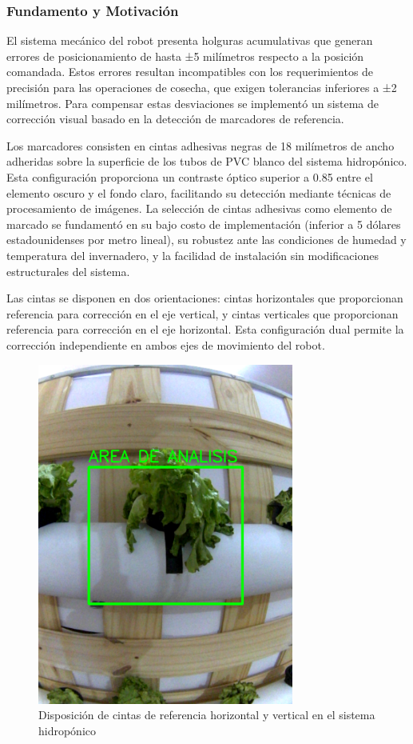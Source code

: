 \subsubsection{Fundamento y Motivación}

El sistema mecánico del robot presenta holguras acumulativas que generan errores de posicionamiento de hasta ±5 milímetros respecto a la posición comandada. Estos errores resultan incompatibles con los requerimientos de precisión para las operaciones de cosecha, que exigen tolerancias inferiores a ±2 milímetros. Para compensar estas desviaciones se implementó un sistema de corrección visual basado en la detección de marcadores de referencia.

Los marcadores consisten en cintas adhesivas negras de 18 milímetros de ancho adheridas sobre la superficie de los tubos de PVC blanco del sistema hidropónico. Esta configuración proporciona un contraste óptico superior a 0.85 entre el elemento oscuro y el fondo claro, facilitando su detección mediante técnicas de procesamiento de imágenes. La selección de cintas adhesivas como elemento de marcado se fundamentó en su bajo costo de implementación (inferior a 5 dólares estadounidenses por metro lineal), su robustez ante las condiciones de humedad y temperatura del invernadero, y la facilidad de instalación sin modificaciones estructurales del sistema.

Las cintas se disponen en dos orientaciones: cintas horizontales que proporcionan referencia para corrección en el eje vertical, y cintas verticales que proporcionan referencia para corrección en el eje horizontal. Esta configuración dual permite la corrección independiente en ambos ejes de movimiento del robot.

\begin{figure}[h]
\centering
\includegraphics[width=0.75\textwidth]{imagenes/configuracion_cintas_referencia.png}
\caption{Disposición de cintas de referencia horizontal y vertical en el sistema hidropónico}
\label{fig:configuracion_cintas}
\end{figure}

